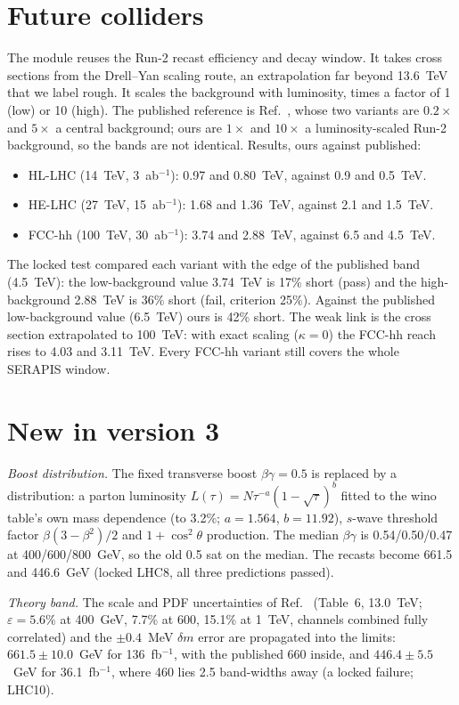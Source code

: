 \documentclass[aps,prd,twocolumn,superscriptaddress,nofootinbib,showkeys]{revtex4-2}
\begin{document}
\section{Future colliders}
The module reuses the Run-2 recast efficiency and decay window. It takes cross sections from the Drell--Yan scaling route, an extrapolation far beyond 13.6~TeV that we label rough. It scales the background with luminosity, times a factor of 1 (low) or 10 (high). The published reference is Ref.~\cite{FCC}, whose two variants are $0.2\times$ and $5\times$ a central background; ours are $1\times$ and $10\times$ a luminosity-scaled Run-2 background, so the bands are not identical. Results, ours against published:
\begin{itemize}
\item HL-LHC (14~TeV, 3~ab$^{-1}$): 0.97 and 0.80~TeV, against 0.9 and 0.5~TeV.
\item HE-LHC (27~TeV, 15~ab$^{-1}$): 1.68 and 1.36~TeV, against 2.1 and 1.5~TeV.
\item FCC-hh (100~TeV, 30~ab$^{-1}$): 3.74 and 2.88~TeV, against 6.5 and 4.5~TeV.
\end{itemize}
The locked test compared each variant with the edge of the published band (4.5~TeV): the low-background value 3.74~TeV is 17\% short (pass) and the high-background 2.88~TeV is 36\% short (fail, criterion 25\%). Against the published low-background value (6.5~TeV) ours is 42\% short. The weak link is the cross section extrapolated to 100~TeV: with exact scaling ($\kappa=0$) the FCC-hh reach rises to 4.03 and 3.11~TeV. Every FCC-hh variant still covers the whole SERAPIS window.

\section{New in version 3}
\emph{Boost distribution.} The fixed transverse boost $\beta\gamma=0.5$ is replaced by a distribution: a parton luminosity $L(\tau)=N\tau^{-a}(1-\sqrt\tau)^b$ fitted to the wino table's own mass dependence (to 3.2\%; $a=1.564$, $b=11.92$), $s$-wave threshold factor $\beta(3-\beta^2)/2$ and $1+\cos^2\theta$ production. The median $\beta\gamma$ is 0.54/0.50/0.47 at 400/600/800~GeV, so the old 0.5 sat on the median. The recasts become 661.5 and 446.6~GeV (locked LHC8, all three predictions passed).

\emph{Theory band.} The scale and PDF uncertainties of Ref.~\cite{Res} (Table~6, 13.0~TeV; $\varepsilon=5.6\%$ at 400~GeV, 7.7\% at 600, 15.1\% at 1~TeV, channels combined fully correlated) and the $\pm0.4$~MeV $\delta m$ error are propagated into the limits: $661.5\pm10.0$~GeV for 136~fb$^{-1}$, with the published 660 inside, and $446.4\pm5.5$~GeV for 36.1~fb$^{-1}$, where 460 lies 2.5 band-widths away (a locked failure; LHC10).
\end{document}

